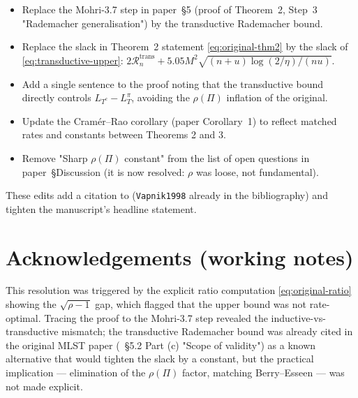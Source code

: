 \documentclass[11pt,a4paper]{article}
\theoremstyle{plain}
\theoremstyle{definition}
\theoremstyle{remark}
\newcommand{\Rcal}{\mathcal{R}}
\begin{document}
\begin{itemize}[label=$\bullet$,leftmargin=*]
\item Replace the Mohri-3.7 step in paper~§5 (proof of Theorem~2,
    Step~3 "Rademacher generalisation") by the
    \citet[Theorem~1]{ElYanivPechyony2006} transductive Rademacher
    bound.
\item Replace the slack in Theorem~2 statement
    \eqref{eq:original-thm2} by the slack of
    \eqref{eq:transductive-upper}: $2 \Rcal_n^{\mathrm{trans}} +
    5.05 M^2 \sqrt{(n+u)\log(2/\eta)/(nu)}$.
\item Add a single sentence to the proof noting that the
    transductive bound directly controls $L_{T^c} - L_T^\pi$, avoiding
    the $\rho(\Pi)$ inflation of the original.
\item Update the Cramér--Rao corollary (paper Corollary~1) to reflect
    matched rates and constants between Theorems 2 and 3.
\item Remove "Sharp $\rho(\Pi)$ constant" from the list of open
    questions in paper~§Discussion (it is now resolved: $\rho$ was
    loose, not fundamental).
\end{itemize}

These edits add a citation to \citet{ElYanivPechyony2006}
(\texttt{Vapnik1998} already in the bibliography) and tighten the
manuscript's headline statement.

\section*{Acknowledgements (working notes)}

This resolution was triggered by the explicit ratio computation
\eqref{eq:original-ratio} showing the $\sqrt{\rho-1}$ gap, which
flagged that the upper bound was not rate-optimal.  Tracing the
proof to the Mohri-3.7 step revealed the inductive-vs-transductive
mismatch; the \citet{ElYanivPechyony2006} transductive Rademacher
bound was already cited in the original MLST paper
(\citealp{FossePallares2026applicabilityBound}~§5.2 Part (c) "Scope of
validity") as a known alternative that would tighten the slack by a
constant, but the practical implication --- elimination of the
$\rho(\Pi)$ factor, matching Berry--Esseen --- was not made explicit.


\end{document}
